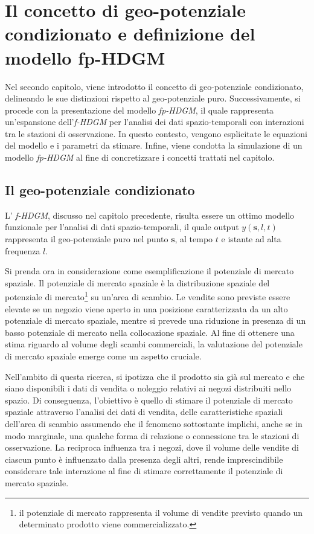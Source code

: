 \chapter[Il concetto di geo-potenziale condizionato e il modello fp-HDGM]{Il concetto di geo-potenziale condizionato e definizione del modello fp-HDGM}
Nel secondo capitolo, viene introdotto il concetto di geo-potenziale condizionato, delineando le sue distinzioni rispetto al geo-potenziale puro. Successivamente, si procede con la presentazione del modello \textit{fp-HDGM}, il quale rappresenta un'espansione dell'\textit{f-HDGM} per l'analisi dei dati spazio-temporali con interazioni tra le stazioni di osservazione. In questo contesto, vengono esplicitate le equazioni del modello e i parametri da stimare. Infine, viene condotta la simulazione di un modello \textit{fp-HDGM} al fine di concretizzare i concetti trattati nel capitolo.
\section[Il geo-potenziale condizionato]{Il geo-potenziale condizionato}
L' \textit{f-HDGM}, discusso nel capitolo precedente, risulta essere un ottimo modello funzionale per l'analisi di dati spazio-temporali, il quale output $y(\mathbf{s}, l, t)$ rappresenta il geo-potenziale puro nel punto $\mathbf{s}$, al tempo $t$ e istante ad alta frequenza $l$.
\par Si prenda ora in considerazione come esemplificazione il potenziale di mercato spaziale. Il potenziale di mercato spaziale è la distribuzione spaziale del potenziale di mercato\footnote{il potenziale di mercato rappresenta il volume di vendite previsto quando un determinato prodotto viene commercializzato.} su un'area di scambio.
Le vendite sono previste essere elevate se un negozio viene aperto in una posizione caratterizzata da un alto potenziale di mercato spaziale, mentre si prevede una riduzione in presenza di un basso potenziale di mercato nella collocazione spaziale.
Al fine di ottenere una stima riguardo al volume degli scambi commerciali, la valutazione del potenziale di mercato spaziale emerge come un aspetto cruciale.
\par Nell'ambito di questa ricerca, si ipotizza che il prodotto sia già sul mercato e che siano disponibili i dati di vendita o noleggio relativi ai negozi distribuiti nello spazio. Di conseguenza, l'obiettivo è quello di stimare il potenziale di mercato spaziale attraverso l'analisi dei dati di vendita, delle caratteristiche spaziali dell'area di scambio assumendo che il fenomeno sottostante implichi, anche se in modo marginale, una qualche forma di relazione o connessione tra le stazioni di osservazione. La reciproca influenza tra i negozi, dove il volume delle vendite di ciascun punto è influenzato dalla presenza degli altri, rende imprescindibile considerare tale interazione al fine di stimare correttamente il potenziale di mercato spaziale.

